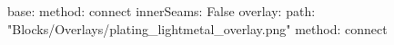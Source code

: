 base:
  method: connect
  innerSeams: False
overlay:
  path: "Blocks/Overlays/plating_lightmetal_overlay.png"
  method: connect